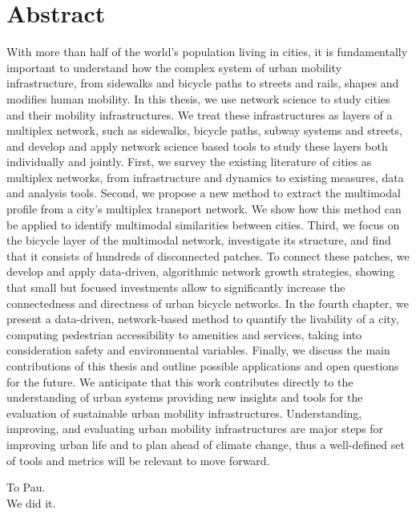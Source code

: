 \documentclass[a4paper,twoside,12pt]{book}
\begin{document}
\chapter*{Abstract}
With more than half of the world's population living in cities, it is fundamentally important to understand how the complex system of urban mobility infrastructure, from sidewalks and bicycle paths to streets and rails, shapes and modifies human mobility. In this thesis, we use network science to study cities and their mobility infrastructures. We treat these infrastructures as layers of a multiplex network, such as sidewalks, bicycle paths, subway systems and streets, and develop and apply network science based tools to study these layers both individually and jointly. First, we survey the existing literature of cities as multiplex networks, from infrastructure and dynamics to existing measures, data and analysis tools. Second, we propose a new method to extract the multimodal profile from a city's multiplex transport network. We show how this method can be applied to identify multimodal similarities between cities. Third, we focus on the bicycle layer of the multimodal network, investigate its structure, and find that it consists of hundreds of disconnected patches. To connect these patches, we develop and apply data-driven, algorithmic network growth strategies, showing that small but focused investments allow to significantly increase the connectedness and directness of urban bicycle networks. In the fourth chapter, we present a data-driven, network-based method to quantify the livability of a city, computing pedestrian accessibility to amenities and services, taking into consideration safety and environmental variables. Finally, we discuss the main contributions of this thesis and outline possible applications and open questions for the future. We anticipate that this work contributes directly to the understanding of urban systems providing new insights and tools for the evaluation of sustainable urban mobility infrastructures. Understanding, improving, and evaluating urban mobility infrastructures are major steps for improving urban life and to plan ahead of climate change, thus a well-defined set of tools and metrics will be relevant to move forward.

\thispagestyle{empty}

\newpage
\frontmatter
\begin{center}
    \thispagestyle{empty}
    \vspace*{\fill}
	\begin{flushright}
    To Pau. \\
	We did it.
	\end{flushright}
    \vspace*{\fill}
\end{center}
\thispagestyle{empty}
\end{document}
